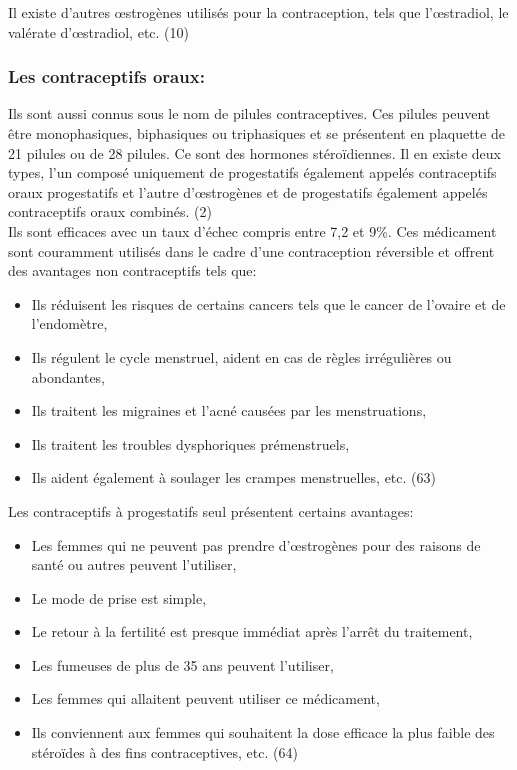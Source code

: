 \noindent Il existe d’autres œstrogènes utilisés pour la contraception, tels que l’œstradiol, le valérate d’œstradiol, etc. (10)

\subsubsection{Les contraceptifs oraux:}

Ils sont aussi connus sous le nom de pilules contraceptives. Ces pilules peuvent être monophasiques, biphasiques ou triphasiques et se présentent en plaquette de 21 pilules ou de 28 pilules. Ce sont des hormones stéroïdiennes. Il en existe deux types, l’un composé uniquement de progestatifs également appelés contraceptifs oraux progestatifs et l’autre d’œstrogènes et de progestatifs également appelés contraceptifs oraux combinés. (2) \\

\noindent Ils sont efficaces avec un taux d’échec compris entre 7,2 et 9\%. Ces médicament sont couramment utilisés dans le cadre d’une contraception réversible et offrent des avantages non contraceptifs tels que: 

\begin{itemize}[label={$\bullet$}, align=right]
  \item	Ils réduisent les risques de certains cancers tels que le cancer de l’ovaire et de l’endomètre,
  \item	Ils régulent le cycle menstruel, aident en cas de règles irrégulières ou abondantes,
  \item Ils traitent les migraines et l’acné causées par les menstruations, 
  \item Ils traitent les troubles dysphoriques prémenstruels, 
  \item Ils aident également à soulager les crampes menstruelles, etc. (63)
\end{itemize}


Les contraceptifs à progestatifs seul présentent certains avantages: 

\begin{itemize}[label={$\bullet$}, align=right]
  \item	Les femmes qui ne peuvent pas prendre d’œstrogènes pour des raisons de santé ou autres peuvent l’utiliser,
  \item	Le mode de prise est simple,
  \item Le retour à la fertilité est presque immédiat après l’arrêt du traitement,
  \item Les fumeuses de plus de 35 ans peuvent l’utiliser, 
  \item Les femmes qui allaitent peuvent utiliser ce médicament, 
  \item Ils conviennent aux femmes qui souhaitent la dose efficace la plus faible des stéroïdes à des fins contraceptives, etc. (64)
\end{itemize}

